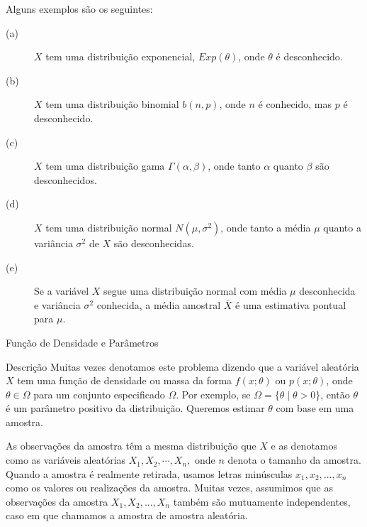 \documentclass[12pt]{beamer}
\begin{document}
\begin{frame}{}
    \begin{block}{Alguns exemplos são os seguintes:}
    \justifying
\begin{description}
\item[(a)~] $X$ tem uma distribuição exponencial, $Exp(\theta)$, onde $\theta$ é desconhecido.
\pause
\item[(b)~] $X$ tem uma distribuição binomial $b(n, p)$, onde $n$ é conhecido, mas $p$ é desconhecido.
\pause
\item[(c)~] $X$ tem uma distribuição gama $\Gamma(\alpha, \beta)$, onde tanto $\alpha$ quanto $\beta$ são desconhecidos.
\pause
\item[(d)~] $X$ tem uma distribuição normal $N(\mu, \sigma^{2})$, onde tanto a média $\mu$ quanto a variância $\sigma^{2}$ de $X$ são desconhecidas.
\pause
\item[(e)~] Se a variável $X$ segue uma distribuição normal com média $\mu$ desconhecida e variância $\sigma^2$ conhecida, a média amostral $\bar{X}$ é uma estimativa pontual para $\mu$.
\end{description}
\end{block}
\end{frame}


\begin{frame}{Função de Densidade e Parâmetros}
	\begin{block}{Descrição}
		\justifying
		Muitas vezes denotamos este problema dizendo que a variável aleatória $X$ tem uma função de densidade ou massa da forma $f(x; \theta)$ ou $p(x; \theta)$, onde $\theta \in \Omega$ para um conjunto especificado $\Omega$. Por exemplo, se $\Omega = \{\theta \mid \theta > 0\}$, então $\theta$ é um parâmetro positivo da distribuição. Queremos estimar $\theta$ com base em uma amostra.
	\end{block}
	\pause
\end{frame}


\begin{frame}{}
    \begin{block}{}
    \justifying
As observações da amostra têm a mesma distribuição que $X$ e as denotamos como as variáveis aleatórias $X_1, X_2, \cdots, X_{n},$ onde $n$ denota o tamanho da amostra. Quando a amostra é realmente retirada, usamos letras minúsculas $x_1, x_2, ..., x_{n}$ como os valores ou realizações da amostra. Muitas vezes, assumimos que as observações da amostra $X_1, X_2, ..., X_{n}$ também são mutuamente independentes, caso em que chamamos a amostra de amostra aleatória.
\end{block}
\end{frame}
\end{document}
